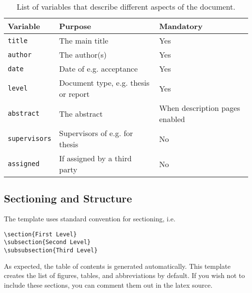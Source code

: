 \documentclass[english]{jamk-report}
\begin{document}
\begin{table}[h]\centering
{}
    \begin{tabularx}{\textwidth-1em}{p{6em}l>{\raggedleft\arraybackslash}X} \toprule
        Variable & Purpose & Mandatory  \\ \midrule
        \texttt{title} & The main title & Yes \\
        \texttt{author} & The author(s) & Yes \\
        \texttt{date} & Date of e.g. acceptance & Yes \\
        \texttt{level} & Document type, e.g. thesis or report & Yes \\
        \texttt{abstract} & The abstract & When description pages enabled \\
        \texttt{supervisors} & Supervisors of e.g. for thesis & No \\
        \texttt{assigned} & If assigned by a third party & No \\

        \bottomrule
    \end{tabularx}
\caption{List of variables that describe different aspects of the document.}
\label{table:vars}
\end{table}


\subsection{Sectioning and Structure}

The template uses standard convention for sectioning, i.e. 

\begin{verbatim}
\section{First Level}
\subsection{Second Level}
\subsubsection{Third Level}
\end{verbatim}

\noindent
As expected, the table of contents is generated automatically. This template creates
the list of figures, tables, and abbreviations by default. If you wish not to include
these sections, you can comment them out in the latex source.
\end{document}

